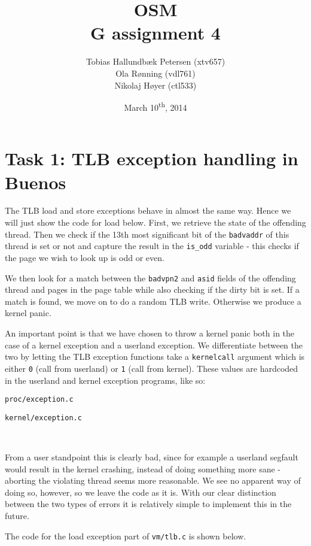 \documentclass[a4paper,12pt]{article}
\title{OSM\\G assignment 4}
\author{Tobias Hallundbæk Petersen (xtv657)\\Ola Rønning (vdl761)\\Nikolaj Høyer (ctl533)}
\date{March 10\textsuperscript{th}, 2014}
\begin{document}
\maketitle
\tableofcontents
\newpage

\section{Task 1: TLB exception handling in Buenos}
The TLB load and store exceptions behave in almost the same way. Hence we will just show the code for load below. First, we retrieve the state of the offending thread. Then we check if the 13th most significant bit of the \texttt{badvaddr} of this thread is set or not and capture the result in the \texttt{is\_odd} variable - this checks if the page we wish to look up is odd or even.

We then look for a match between the \texttt{badvpn2} and \texttt{asid} fields of the offending thread and pages in the page table while also checking if the dirty bit is set. If a match is found, we move on to do a random TLB write. Otherwise we produce a kernel panic.

An important point is that we have chosen to throw a kernel panic both in the case of a kernel exception and a userland exception. We differentiate between the two by letting the TLB exception functions take a \texttt{kernelcall} argument which is either \texttt{0} (call from userland) or \texttt{1} (call from kernel). These values are hardcoded in the userland and kernel exception programs, like so:


\texttt{proc/exception.c}


\texttt{kernel/exception.c}

\

From a user standpoint this is clearly bad, since for example a userland segfault would result in the kernel crashing, instead of doing something more sane - aborting the violating thread seems more reasonable. We see no apparent way of doing so, however, so we leave the code as it is. With our clear distinction between the two types of errors it is relatively simple to implement this in the future.

The code for the load exception part of \texttt{vm/tlb.c} is shown below.

\end{document}
